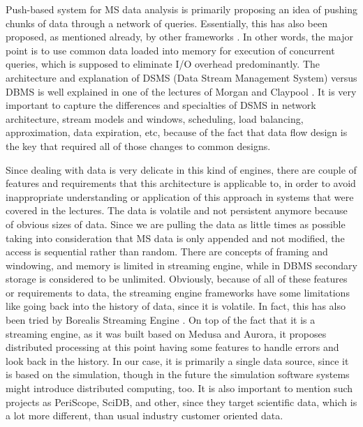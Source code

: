 \documentclass[11pt,a4paper]{report}
\begin{document}
Push-based system for MS data analysis is primarily proposing an idea of pushing chunks of data through a network of queries. Essentially, this has also been proposed, as mentioned already, by other frameworks \cite{DataPath,Volcano,Qpipe}. In other words, the major point is to use common data loaded into memory for execution of concurrent queries, which is supposed to eliminate I/O overhead predominantly. The architecture and explanation of DSMS (Data Stream Management System) versus DBMS is well explained in one of the lectures of Morgan and Claypool \cite{DataStreamManagement}. It is very important to capture the differences and specialties of DSMS in network architecture, stream models and windows, scheduling, load balancing, approximation, data expiration, etc, because of the fact that data flow design is the key that required all of those changes to common designs.

Since dealing with data is very delicate in this kind of engines, there are couple of features and requirements that this architecture is applicable to, in order to avoid inappropriate understanding or application of this approach in systems that were covered in the lectures\cite{DataStreamManagement}. The data is volatile and not persistent anymore because of obvious sizes of data.  Since we are pulling the data as little times as possible taking into consideration that MS data is only appended and not modified, the access is sequential rather than random. There are concepts of framing and windowing, and memory is limited in streaming engine, while in DBMS secondary storage is considered to be unlimited. Obviously, because of all of these features or requirements to data, the streaming engine frameworks have some limitations like going back into the history of data, since it is volatile. In fact, this has also been tried by Borealis Streaming Engine \cite{borealis}. On top of the fact that it is a streaming engine, as it was built based on Medusa\cite{medusa} and Aurora\cite{aurora}, it proposes distributed processing at this point having some features to handle errors and look back in the history. In our case, it is primarily a single data source, since it is based on the simulation, though in the future the simulation software systems might introduce distributed computing, too. It is also important to mention such projects as PeriScope\cite{PeriScope}, SciDB\cite{SciDB}, and other\cite{SDSS_SIGMOD02,QBISM_ICDE94}, since they target scientific data, which is a lot more different, than usual industry customer oriented data.
\end{document}

